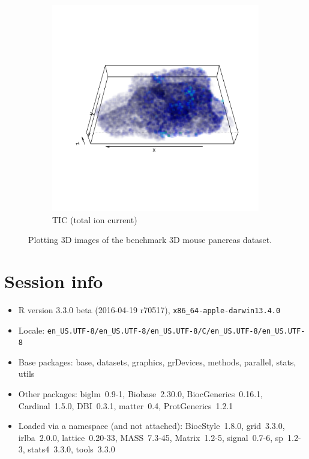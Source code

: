 \documentclass[a4paper]{article}
\begin{document}
\begin{figure}[h]
\begin{subfigure}{.4\textwidth}
\includegraphics{matter-extra-011}
\caption{\small TIC (total ion current)}
\label{fig:tic}
\end{subfigure}
\caption{\small Plotting 3D images of the benchmark 3D mouse pancreas dataset.}
\end{figure}


\section{Session info}

\begin{itemize}\raggedright
  \item R version 3.3.0 beta (2016-04-19 r70517), \verb|x86_64-apple-darwin13.4.0|
  \item Locale: \verb|en_US.UTF-8/en_US.UTF-8/en_US.UTF-8/C/en_US.UTF-8/en_US.UTF-8|
  \item Base packages: base, datasets, graphics, grDevices, methods, parallel, stats,
    utils
  \item Other packages: biglm~0.9-1, Biobase~2.30.0, BiocGenerics~0.16.1, Cardinal~1.5.0,
    DBI~0.3.1, matter~0.4, ProtGenerics~1.2.1
  \item Loaded via a namespace (and not attached): BiocStyle~1.8.0, grid~3.3.0,
    irlba~2.0.0, lattice~0.20-33, MASS~7.3-45, Matrix~1.2-5, signal~0.7-6, sp~1.2-3,
    stats4~3.3.0, tools~3.3.0
\end{itemize}
% 

\end{document}
